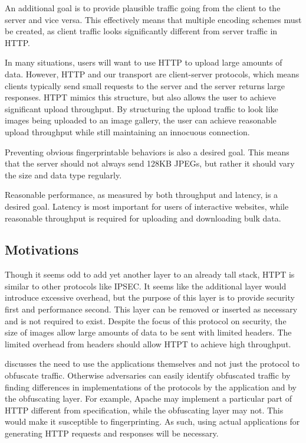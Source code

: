An additional goal is to provide plausible traffic going from the client to the server and vice versa. This effectively means that multiple encoding schemes must be created, as client traffic looks significantly different from server traffic in HTTP. 

In many situations, users will want to use HTTP to upload large amounts of data. However, HTTP and our transport are client-server protocols, which means clients typically send small requests to the server and the server returns large responses. HTPT mimics this structure, but also allows the user to achieve significant upload throughput. By structuring the upload traffic to look like images being uploaded to an image gallery, the user can achieve reasonable upload throughput while still maintaining an innocuous connection.

Preventing obvious fingerprintable behaviors is also a desired goal. This means that the server should not always send 128KB JPEGs, but rather it should vary the size and data type regularly.  

Reasonable performance, as measured by both throughput and latency, is a desired goal. Latency is most important for users of interactive websites, while reasonable throughput is required for uploading and downloading bulk data. 

\subsection{Motivations}
Though it seems odd to add yet another layer to an already tall stack, HTPT is similar to other protocols like IPSEC. It seems like the additional layer would introduce excessive overhead, but the purpose of this layer is to provide security first and performance second. This layer can be removed or inserted as necessary and is not required to exist. Despite the focus of this protocol on security, the size of images allow large amounts of data to be sent with limited headers. The limited overhead from headers should allow HTPT to achieve high throughput.

\cite{Ref2} discusses the need to use the applications themselves and not just the protocol to obfuscate traffic. Otherwise adversaries can easily identify obfuscated traffic by finding differences in implementations of the protocols by the application and by the obfuscating layer. For example, Apache may implement a particular part of HTTP different from specification, while the obfuscating layer may not. This would make it susceptible to fingerprinting. As such, using actual applications for generating HTTP requests and responses will be necessary.

